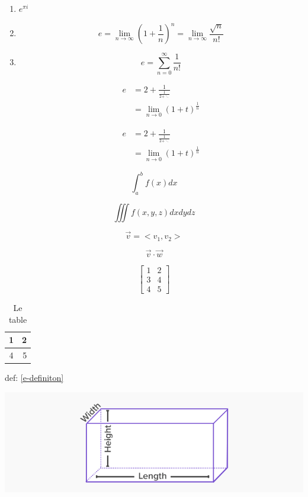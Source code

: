 \documentclass{article}
\begin{document}
\begin{enumerate}
\item $e^{\pi i}$
\item $$
e = \lim_{n \to \infty}\left(1 + \frac{1}{n}\right)^n = \lim_{n \to \infty} \frac{\sqrt{n}}{n!}
$$

\item $$
e = \sum_{n=0}^{\infty} \frac{1}{n!}
$$

\begin{align}
\label{e-definiton}
    e &= 2 + \frac{1}{\frac{1}{2 + \ddots}} \\
    &= \lim_{n \to 0} (1 + t)^ \frac{1}{n}
\end{align}

\begin{equation}
\begin{split}
    e &= 2 + \frac{1}{\frac{1}{2 + \ddots}} \\
    &= \lim_{n \to 0} (1 + t)^ \frac{1}{n}
\end{split}
\end{equation}

\end{enumerate}

$$\int_{a}^{b} f(x)dx$$

$$\iiint f(x, y, z)dxdydz$$

$$\vec{v} = <v_1, v_2>$$

$$\vec{v} \cdot \vec{w}$$

$$
\begin{bmatrix}
    1 & 2 \\
    3 & 4 \\
    4 & 5
\end{bmatrix}
$$

\newpage
\begin{table}
\caption{Le table}    
\begin{center}
\begin{tabular}{|c|r|}
    \hline
    1 & 2 \\\hline
    4 & 5 \\\hline
\end{tabular}
\end{center}
\end{table}

def: \ref{e-definiton}

\includegraphics[scale=0.5]{length.png}
\end{document}
